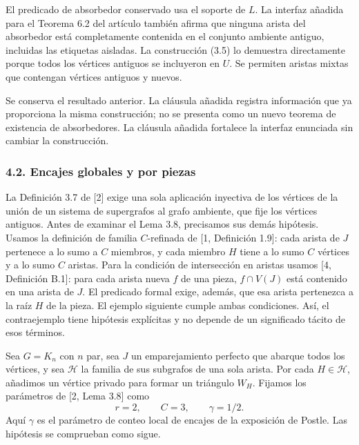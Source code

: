 \documentclass[spanish,11pt,a4paper]{article}
\begin{document}
El predicado de absorbedor conservado usa el soporte de \(L\). La interfaz añadida para el Teorema 6.2 del artículo también afirma que ninguna arista del absorbedor está completamente contenida en el conjunto ambiente antiguo, incluidas las etiquetas aisladas. La construcción (3.5) lo demuestra directamente porque todos los vértices antiguos se incluyeron en \(U\). Se permiten aristas mixtas que contengan vértices antiguos y nuevos.

Se conserva el resultado anterior. La cláusula añadida registra información que ya proporciona la misma construcción; no se presenta como un nuevo teorema de existencia de absorbedores. La cláusula añadida fortalece la interfaz enunciada sin cambiar la construcción.


\subsubsection{4.2. Encajes globales y por piezas}\label{encajes-globales-y-por-piezas}

La Definición 3.7 de {[}2{]} exige una sola aplicación inyectiva de los vértices de la unión de un sistema de supergrafos al grafo ambiente, que fije los vértices antiguos. Antes de examinar el Lema 3.8, precisamos sus demás hipótesis. Usamos la definición de familia \(C\)-refinada de {[}1, Definición 1.9{]}: cada arista de \(J\) pertenece a lo sumo a \(C\) miembros, y cada miembro \(H\) tiene a lo sumo \(C\) vértices y a lo sumo \(C\) aristas. Para la condición de intersección en aristas usamos {[}4, Definición B.1{]}: para cada arista nueva \(f\) de una pieza, \(f\cap V(J)\) está contenido en una arista de \(J\). El predicado formal exige, además, que esa arista pertenezca a la raíz \(H\) de la pieza. El ejemplo siguiente cumple ambas condiciones. Así, el contraejemplo tiene hipótesis explícitas y no depende de un significado tácito de esos términos.

Sea \(G=K_n\) con \(n\) par, sea \(J\) un emparejamiento perfecto que abarque todos los vértices, y sea \(\mathcal H\) la familia de sus subgrafos de una sola arista. Por cada \(H\in\mathcal H\), añadimos un vértice privado para formar un triángulo \(W_H\). Fijamos los parámetros de {[}2, Lema 3.8{]} como \[r=2,\qquad C=3,\qquad \gamma=1/2.
\tag{4.1}\] Aquí \(\gamma\) es el parámetro de conteo local de encajes de la exposición de Postle. Las hipótesis se comprueban como sigue.
\end{document}
